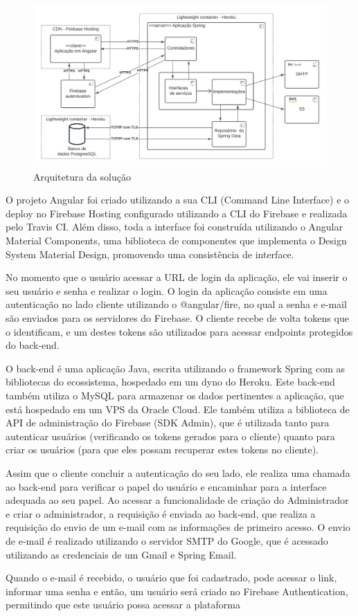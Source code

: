 \begin{figure}[htb]
    \centering
	\includegraphics[width=16cm]{imagens/Arquitetura.png}
	\caption{Arquitetura da solução}
\end{figure}
\FloatBarrier

O projeto Angular foi criado utilizando a sua CLI (Command Line Interface) e o deploy no Firebase Hosting configurado utilizando a CLI do Firebase e realizada pelo Travis CI. Além disso, toda a interface foi construída utilizando o Angular Material Components, uma biblioteca de componentes que implementa o Design System Material Design, promovendo uma consistência de interface.

No momento que o usuário acessar a URL de login da aplicação, ele vai inserir o seu usuário e senha e realizar o login. O login da aplicação consiste em uma autenticação no lado cliente utilizando o @angular/fire, no qual a senha e e-mail são enviados para os servidores do Firebase. O cliente recebe de volta tokens que o identificam, e um destes tokens são utilizados para acessar endpoints protegidos do back-end.

O back-end é uma aplicação Java, escrita utilizando o framework Spring com as bibliotecas do ecossistema, hospedado em um dyno do Heroku. Este back-end também utiliza o MySQL para armazenar os dados pertinentes a aplicação, que está hospedado em um VPS da Oracle Cloud. Ele também utiliza a biblioteca de API de administração do Firebase (SDK Admin), que é utilizada tanto para autenticar usuários (verificando os tokens gerados para o cliente) quanto para criar os usuários (para que eles possam recuperar estes tokens no cliente).

Assim que o cliente concluir a autenticação do seu lado, ele realiza uma chamada ao back-end para verificar o papel do usuário e encaminhar para a interface adequada ao seu papel. Ao acessar a funcionalidade de criação do Administrador e criar o administrador, a requisição é enviada ao back-end, que realiza a requisição do envio de um e-mail com as informações de primeiro acesso. O envio de e-mail é realizado utilizando o servidor SMTP do Google, que é acessado utilizando as credenciais de um Gmail e Spring Email.

Quando o e-mail é recebido, o usuário que foi cadastrado, pode acessar o link, informar uma senha e então, um usuário será criado no Firebase Authentication, permitindo que este usuário possa acessar a plataforma
